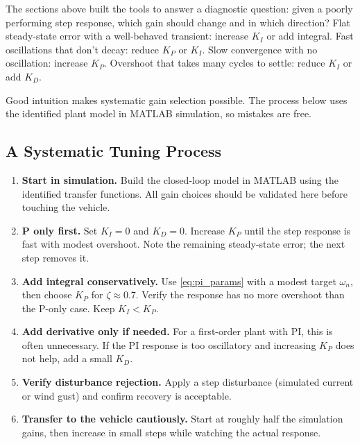\documentclass[../../book.tex]{subfiles}
\begin{document}
The sections above built the tools to answer a diagnostic question: given a
poorly performing step response, which gain should change and in which
direction?  Flat steady-state error with a well-behaved transient: increase
$K_I$ or add integral.  Fast oscillations that don't decay: reduce $K_P$ or
$K_I$.  Slow convergence with no oscillation: increase $K_P$.  Overshoot that
takes many cycles to settle: reduce $K_I$ or add $K_D$.

Good intuition makes systematic gain selection possible.  The process below
uses the identified plant model in MATLAB simulation, so mistakes are free.
  
\subsection{A Systematic Tuning Process}

\begin{enumerate}
  \item \textbf{Start in simulation.}  Build the closed-loop model in MATLAB
    using the identified transfer functions.  All gain
    choices should be validated here before touching the vehicle.

  \item \textbf{P only first.}  Set $K_I = 0$ and $K_D = 0$.  Increase
    $K_P$ until the step response is fast with modest overshoot.  Note the
    remaining steady-state error; the next step removes it.

  \item \textbf{Add integral conservatively.}  Use \cref{eq:pi_params} with
    a modest target $\omega_n$, then choose $K_P$ for $\zeta \approx 0.7$.
    Verify the response has no more overshoot than the P-only case.
    Keep $K_I < K_P$.

  \item \textbf{Add derivative only if needed.}  For a first-order plant
    with PI, this is often unnecessary.  If the PI response is too
    oscillatory and increasing $K_P$ does not help, add a small $K_D$.

  \item \textbf{Verify disturbance rejection.}  Apply a step disturbance
    (simulated current or wind gust) and confirm recovery is acceptable.

  \item \textbf{Transfer to the vehicle cautiously.}  Start at roughly half
    the simulation gains, then increase in small steps while watching the
    actual response.
\end{enumerate}
\end{document}
